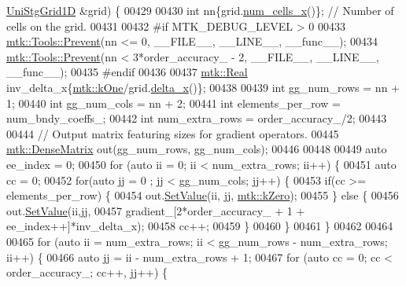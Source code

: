 \begin{DoxyCode}
{{      \hyperlink{classmtk_1_1UniStgGrid1D}{UniStgGrid1D} &grid) \{
00429 
00430   \textcolor{keywordtype}{int} nn\{grid.\hyperlink{classmtk_1_1UniStgGrid1D_af1b3729d8afa07be5b2775ed68015b80}{num\_cells\_x}()\}; \textcolor{comment}{// Number of cells on the grid.}
00431 
00432 \textcolor{preprocessor}{  #if MTK\_DEBUG\_LEVEL > 0}
00433   \hyperlink{classmtk_1_1Tools_afe5bb096309258e2e72503fd7b41c7e0}{mtk::Tools::Prevent}(nn <= 0, \_\_FILE\_\_, \_\_LINE\_\_, \_\_func\_\_);
00434   \hyperlink{classmtk_1_1Tools_afe5bb096309258e2e72503fd7b41c7e0}{mtk::Tools::Prevent}(nn < 3*order\_accuracy\_ - 2, \_\_FILE\_\_, \_\_LINE\_\_, \_\_func\_\_);
00435 \textcolor{preprocessor}{  #endif}
00436 
00437   \hyperlink{group__c01-roots_gac080bbbf5cbb5502c9f00405f894857d}{mtk::Real} inv\_delta\_x\{\hyperlink{group__c01-roots_ga26407c24d43b6b95480943340d285c71}{mtk::kOne}/grid.\hyperlink{classmtk_1_1UniStgGrid1D_a6e7173b01241632cf509496d66b9f74c}{delta\_x}()\};
00438 
00439   \textcolor{keywordtype}{int} gg\_num\_rows = nn + 1;
00440   \textcolor{keywordtype}{int} gg\_num\_cols = nn + 2;
00441   \textcolor{keywordtype}{int} elements\_per\_row = num\_bndy\_coeffs\_;
00442   \textcolor{keywordtype}{int} num\_extra\_rows = order\_accuracy\_/2;
00443 
00444   \textcolor{comment}{// Output matrix featuring sizes for gradient operators.}
00445   \hyperlink{classmtk_1_1DenseMatrix}{mtk::DenseMatrix} out(gg\_num\_rows, gg\_num\_cols);
00446 
00448 
00449   \textcolor{keyword}{auto} ee\_index = 0;
00450   \textcolor{keywordflow}{for} (\textcolor{keyword}{auto} ii = 0; ii < num\_extra\_rows; ii++) \{
00451     \textcolor{keyword}{auto} cc = 0;
00452     \textcolor{keywordflow}{for}(\textcolor{keyword}{auto} jj = 0 ; jj < gg\_num\_cols; jj++) \{
00453       \textcolor{keywordflow}{if}(cc >= elements\_per\_row) \{
00454         out.\hyperlink{classmtk_1_1DenseMatrix_ae0f873a6d3a734da467cafb817da64ae}{SetValue}(ii, jj, \hyperlink{group__c01-roots_ga59a451a5fae30d59649bcda274fea271}{mtk::kZero});
00455       \} \textcolor{keywordflow}{else} \{
00456         out.\hyperlink{classmtk_1_1DenseMatrix_ae0f873a6d3a734da467cafb817da64ae}{SetValue}(ii,jj,
00457                      gradient\_[2*order\_accuracy\_ + 1 + ee\_index++]*inv\_delta\_x);
00458         cc++;
00459       \}
00460     \}
00461   \}
00462 
00464 
00465   \textcolor{keywordflow}{for} (\textcolor{keyword}{auto} ii = num\_extra\_rows; ii < gg\_num\_rows - num\_extra\_rows; ii++) \{
00466     \textcolor{keyword}{auto} jj = ii - num\_extra\_rows + 1;
00467     \textcolor{keywordflow}{for} (\textcolor{keyword}{auto} cc = 0; cc < order\_accuracy\_; cc++, jj++) \{
}}
\end{DoxyCode}
